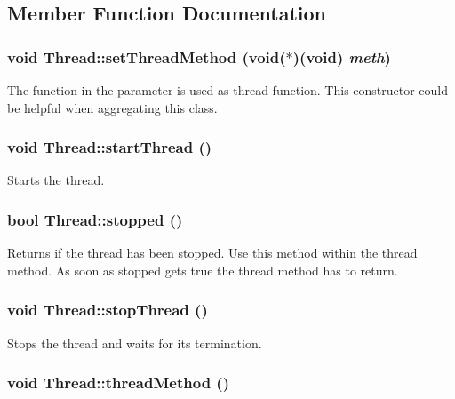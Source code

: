 \subsection{Member Function Documentation}
\hypertarget{classThread_ac504c0ff927a69c3a8e1a12f5a3addb8}{
\subsubsection[{setThreadMethod}]{\setlength{\rightskip}{0pt plus 5cm}void Thread::setThreadMethod (void($\ast$)(void) {\em meth})}}
\label{classThread_ac504c0ff927a69c3a8e1a12f5a3addb8}
The function in the parameter is used as thread function. This constructor could be helpful when aggregating this class. \hypertarget{classThread_a5502205d727c00752f95af27a063d983}{
\subsubsection[{startThread}]{\setlength{\rightskip}{0pt plus 5cm}void Thread::startThread ()}}
\label{classThread_a5502205d727c00752f95af27a063d983}
Starts the thread. \hypertarget{classThread_ae088be9ac88ea8eaef813638c497f91b}{
\subsubsection[{stopped}]{\setlength{\rightskip}{0pt plus 5cm}bool Thread::stopped ()}}
\label{classThread_ae088be9ac88ea8eaef813638c497f91b}
Returns if the thread has been stopped. Use this method within the thread method. As soon as stopped gets true the thread method has to return. \hypertarget{classThread_ac2bbc5e496966abd6d13d73f7e0810d6}{
\subsubsection[{stopThread}]{\setlength{\rightskip}{0pt plus 5cm}void Thread::stopThread ()}}
\label{classThread_ac2bbc5e496966abd6d13d73f7e0810d6}
Stops the thread and waits for its termination. \hypertarget{classThread_adc91220b96d25109b5f3ea73f8a75947}{
\subsubsection[{threadMethod}]{\setlength{\rightskip}{0pt plus 5cm}void Thread::threadMethod ()}}
